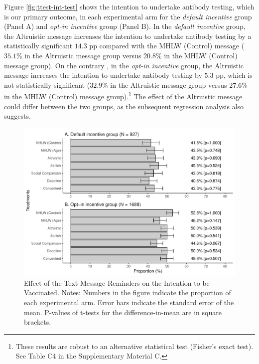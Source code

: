\documentclass[
      12pt,
    a4paper
]{article}
\begin{document}
Figure \ref{fig:ttest-int-test} shows the intention to undertake antibody testing, which is our primary outcome, in each experimental arm for the \emph{default incentive} group (Panel A) and \emph{opt-in incentive} group (Panel B). In the \emph{default incentive} group, the Altruistic message increases the intention to undertake antibody testing by a statistically significant \(14.3\) pp compared with the MHLW (Control) message (\(35.1\)\% in the Altruistic message group versus \(20.8\)\% in the MHLW (Control) message group). On the contrary , in the \emph{opt-in incentive} group, the Altruistic message increases the intention to undertake antibody testing by \(5.3\) pp, which is not statistically significant (\(32.9\)\% in the Altruistic message group versus \(27.6\)\% in the MHLW (Control) message group).\footnote{These results are robust to an alternative statistical test (Fisher's exact test). See Table C4 in the Supplementary Material C.} The effect of the Altruistic message could differ between the two groups, as the subsequent regression analysis also suggests.

\begin{figure}[t]
\includegraphics{Main-Document-LaTeX_files/figure-latex/ttest-int-vacc-1} \caption{Effect of the Text Message Reminders on the Intention to be Vaccinated. Notes: Numbers in the figure indicate the proportion of each experimental arm. Error bars indicate the standard error of the mean. P-values of t-tests for the difference-in-mean are in square brackets.}\label{fig:ttest-int-vacc}
\end{figure}
\end{document}
